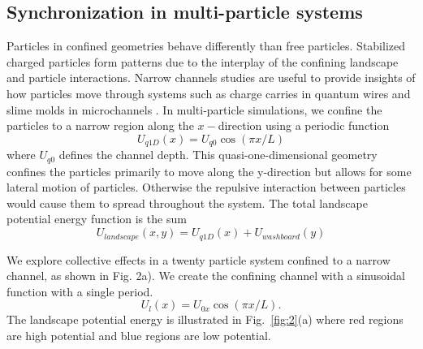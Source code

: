 \documentclass[twocolumn,preprintnumbers,amsmath,amssymb,aps,prx]{revtex4}
\begin{document}
\subsection{Synchronization in multi-particle systems}
\label{sec:sync}

Particles in confined geometries behave differently than free particles.
Stabilized charged particles form patterns
due to the interplay of the confining landscape 
and particle interactions.
Narrow channels studies are useful to provide insights 
of how particles move through systems 
such as charge carries in quantum wires \cite{Tarucha1995} and
slime molds in microchannels \cite{Gholami2015}.
 In multi-particle simulations, we confine
 the particles to a narrow region
 along the $x-$direction 
 using a periodic function 
 \begin{equation}
   U_{q1D}(x) = U_{q0} \cos{(\pi x / L)}
     \label{eq:xsubstrate}
 \end{equation}
 where $U_{q0}$ defines the channel depth.
 This 
 quasi-one-dimensional geometry
 confines the particles
 primarily to move 
 along the y-direction
 but allows for some lateral motion of particles.
 Otherwise the repulsive interaction between
 particles would cause them to spread throughout the system.
 The total landscape potential energy function is the sum
 \begin{equation}
   U_{landscape}(x,y) =  U_{q1D}(x) + U_{washboard}(y)
   \label{eq:xylandscape}
 \end{equation}

We explore collective effects in a 
twenty particle system confined to a narrow channel, as shown in Fig. 2a).  We create the confining channel with a sinusoidal function
with a single period.
\begin{equation}
  \label{eq:channel}
  U_l(x) = U_{0x} \cos{(\pi x/L)}.
\end{equation}
The landscape potential energy is illustrated in Fig.~\ref{fig:2}(a)
where red regions are high potential
and blue regions are low potential.
\end{document}
